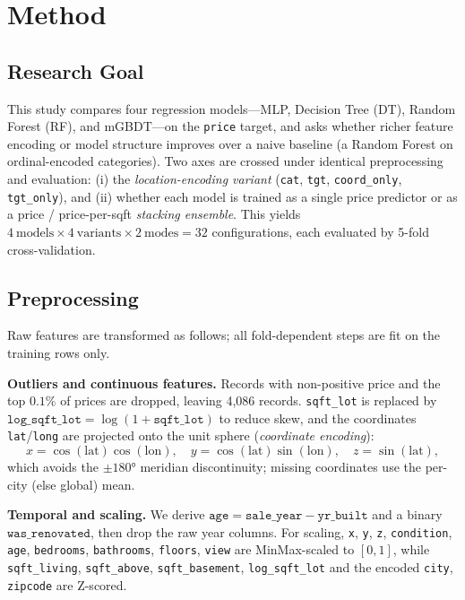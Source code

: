 \section{Method}
\label{sec:method}

\subsection{Research Goal}

This study compares four regression models---MLP, Decision Tree (DT), Random Forest
(RF), and mGBDT---on the \texttt{price} target, and asks whether richer feature
encoding or model structure improves over a naive baseline (a Random Forest on
ordinal-encoded categories).
Two axes are crossed under identical preprocessing and evaluation: (i) the
\emph{location-encoding variant} (\texttt{cat}, \texttt{tgt}, \texttt{coord\_only},
\texttt{tgt\_only}), and (ii) whether each model is trained as a single price
predictor or as a price / price-per-sqft \emph{stacking ensemble}. This yields
$4\ \text{models}\times 4\ \text{variants}\times 2\ \text{modes}=32$ configurations,
each evaluated by 5-fold cross-validation.

\subsection{Preprocessing}

Raw features are transformed as follows; all fold-dependent steps are fit on the
training rows only.

\textbf{Outliers and continuous features.}
Records with non-positive price and the top $0.1\%$ of prices are dropped,
leaving 4,086 records. \texttt{sqft\_lot} is replaced by
$\texttt{log\_sqft\_lot}=\log(1+\texttt{sqft\_lot})$ to reduce skew, and the
coordinates \texttt{lat}/\texttt{long} are projected onto the unit sphere
(\emph{coordinate encoding}):
\begin{equation}
  x = \cos(\text{lat})\cos(\text{lon}),\quad
  y = \cos(\text{lat})\sin(\text{lon}),\quad
  z = \sin(\text{lat}),
\end{equation}
which avoids the $\pm180°$ meridian discontinuity; missing coordinates use the
per-city (else global) mean.

\textbf{Temporal and scaling.}
We derive $\texttt{age}=\texttt{sale\_year}-\texttt{yr\_built}$ and a binary
$\texttt{was\_renovated}$, then drop the raw year columns. For scaling,
\texttt{x}, \texttt{y}, \texttt{z}, \texttt{condition}, \texttt{age},
\texttt{bedrooms}, \texttt{bathrooms}, \texttt{floors}, \texttt{view} are
MinMax-scaled to $[0,1]$, while \texttt{sqft\_living}, \texttt{sqft\_above},
\texttt{sqft\_basement}, \texttt{log\_sqft\_lot} and the encoded \texttt{city},
\texttt{zipcode} are Z-scored.


